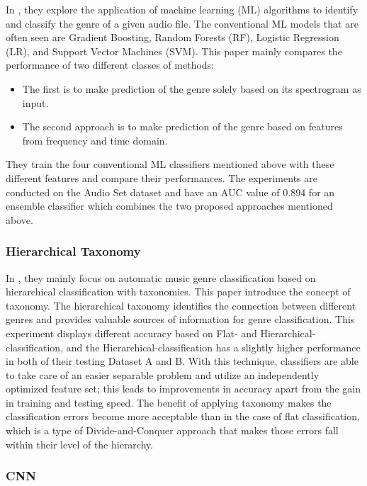 In \citet{Bahuleyan2018}, they explore the application of machine learning (ML) algorithms to identify and classify the genre of a given audio file. The conventional ML models that are often seen are Gradient Boosting, Random Forests (RF), Logistic Regression (LR), and Support Vector Machines (SVM). This paper mainly compares the performance of two different classes of methods:
\begin{itemize}
    \item The first is to make prediction of the genre solely based on its spectrogram as input.
    \item The second approach is to make prediction of the genre based on features from frequency and time domain.
\end{itemize}
They train the four conventional ML classifiers mentioned above with these different features and compare their performances. The experiments are conducted on the Audio Set dataset \cite{Gemmeke2017} and have an AUC value of 0.894 for an ensemble classifier which combines the two proposed approaches mentioned above.

\subsubsection{Hierarchical Taxonomy}

In \citet{Li2005}, they mainly focus on automatic music genre classification based on hierarchical classification with taxonomies. This paper introduce the concept of taxonomy. The hierarchical taxonomy identifies the connection between different genres and provides valuable sources of information for genre classification. This experiment displays different accuracy based on Flat- and Hierarchical-classification, and the  Hierarchical-classification has a slightly higher performance in both of their testing Dataset A and B.
With this technique, classifiers are able to take care of an easier separable problem and utilize an independently optimized feature set; this leads to improvements in accuracy apart from the gain in training and testing speed. The benefit of applying taxonomy makes the classification errors become more acceptable than in the case of flat classification, which is a type of Divide-and-Conquer approach that makes those errors fall within their level of the hierarchy.

\subsubsection{CNN}

